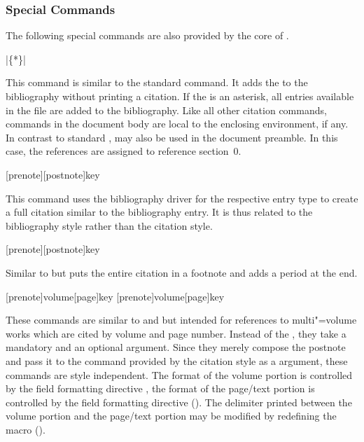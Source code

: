 \documentclass{ltxdockit}[2011/03/25]
\begin{document}
\subsubsection{Special Commands}
\label{use:cit:spc}

The following special commands are also provided by the core of .

\begin{ltxsyntax}

|\{*\}|

This command is similar to the standard \latex {} command. It adds the  to the bibliography without printing a citation. If the  is an asterisk, all entries available in the  file are added to the bibliography. Like all other citation commands,  commands in the document body are local to the enclosing  environment, if any. In contrast to standard \latex,  may also be used in the document preamble. In this case, the references are assigned to reference section~0.

[prenote][postnote]{key}

This command uses the bibliography driver for the respective entry type to create a full citation similar to the bibliography entry. It is thus related to the bibliography style rather than the citation style.

[prenote][postnote]{key}

Similar to  but puts the entire citation in a footnote and adds a period at the end.

[prenote]{volume}[page]{key}
[prenote]{volume}[page]{key}

These commands are similar to  and  but intended for references to multi"=volume works which are cited by volume and page number. Instead of the , they take a mandatory  and an optional  argument. Since they merely compose the postnote and pass it to the  command provided by the citation style as a  argument, these commands are style independent. The format of the volume portion is controlled by the field formatting directive , the format of the page/text portion is controlled by the field formatting directive  (). The delimiter printed between the volume portion and the page/text portion may be modified by redefining the macro  ().


\end{ltxsyntax}
\end{document}
